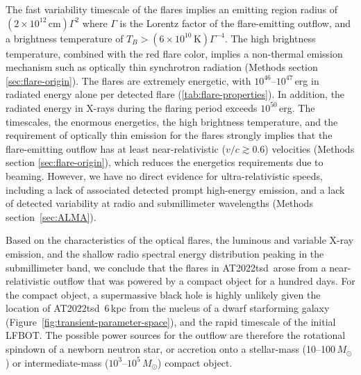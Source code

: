 \documentclass{nature_plusfigure}
\newcommand{\at}{AT2022tsd}
\begin{document}
The fast variability timescale of the flares implies an emitting region radius of $(2\times10^{12}\,\mathrm{cm}) \Gamma^2$ where $\Gamma$ is the Lorentz factor of the flare-emitting outflow,
and a brightness temperature of $T_B>(6\times10^{10}\,\mathrm{K})\Gamma^{-4}$.
The high brightness temperature, combined with the red flare color, implies a non-thermal emission mechanism such as optically thin synchrotron radiation (Methods section \ref{sec:flare-origin}).
The flares are extremely energetic, with $10^{46}$--$10^{47}$\,erg in radiated energy alone per detected flare (\ref{tab:flare-properties}).
In addition, the radiated energy in X-rays during the flaring period exceeds $10^{50}$\,erg.
The timescales, the enormous energetics, the high brightness temperature, and the requirement of optically thin emission for the flares strongly implies that the flare-emitting outflow has at least near-relativistic ($v/c\gtrsim0.6$) velocities (Methods section \ref{sec:flare-origin}),
which reduces the energetics requirements due to beaming.
However, we have no direct evidence for ultra-relativistic speeds, including a lack of associated detected prompt high-energy emission,
and a lack of detected variability at radio and submillimeter wavelengths (Methods section~\ref{sec:ALMA}).

Based on the characteristics of the optical flares, the luminous and variable X-ray emission, and the shallow radio spectral energy distribution peaking in the submillimeter band, we conclude that the flares in \at\ arose from a near-relativistic outflow that was powered by a compact object for a hundred days. For the compact object, a supermassive black hole is highly unlikely given the location of \at\ 6\,kpc from the nucleus of a dwarf starforming galaxy (Figure~\ref{fig:transient-parameter-space}), and the rapid timescale of the initial LFBOT. The possible power sources for the outflow are therefore the rotational spindown of a newborn neutron star, or accretion onto a stellar-mass (10--100\,$M_\odot$) or intermediate-mass ($10^{3}$--$10^{5}\,M_\odot$) compact object.

\end{document}
